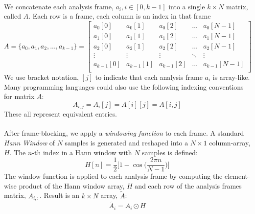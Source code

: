 \documentclass[12pt,letterpaper]{article}
\begin{document}
\paragraph*{}We concatenate each analysis frame, $a_{i}, i \in [0,k-1]$ into a single $k \times N$ matrix, called $A$. Each row is a frame, each column is an index in that frame
\begin{equation}
\label{eqn-FrameMatrix}
A = \big\{ a_{0} , a_{1} , a_{2} , ... , a_{k-1} \big\} = 
\begin{bmatrix}
a_{0}[0] & a_{0}[1] & a_{0}[2] & \hdots & a_{0}[N-1] \\
a_{1}[0] & a_{1}[1] & a_{1}[2] & \hdots & a_{1}[N-1] \\
a_{2}[0] & a_{2}[1] & a_{2}[2] & \hdots & a_{2}[N-1] \\
\vdots 		& \vdots 	  & \vdots 		& \ddots & \vdots        \\
a_{k-1}[0] & a_{k-1}[1] & a_{k-1}[2] & \hdots & a_{k-1}[N-1] \\
\end{bmatrix}
\end{equation}
We use bracket notation, $[j]$ to indicate that each analysis frame $a_i$ is array-like. Many programming languages could also use the following indexing conventions for matrix $A$:
\begin{equation}
\label{eqn-IndexingA}
A_{i,j} = A_i[j] = A[i][j] = A[i,j]
\end{equation}
These all represent equivalent entries.

\paragraph*{}After frame-blocking, we apply a \textit{windowing function} to each frame. A standard \textit{Hann Window} of $N$ samples is generated and reshaped into a $N \times 1$ column-array, $H$. The $n$-th index in a Hann window with $N$ samples is defined:
\begin{equation}
\label{eqn-Hann}
H[n] = \frac{1}{2}\bigg[ 1 - \cos\Big( \frac{2\pi n}{N-1}\Big)\bigg]
\end{equation}
The window function is applied to each analysis frame by computing the element-wise product of the Hann window array, $H$ and each row of the analysis frames matrix, $A_{i,:}$. Result is an $k \times N$ array, $\widetilde{A}$:
\begin{equation}
\label{eqn-WindowMatrix}
\widetilde{A_i} = A_i \odot H
\end{equation}
\end{document}
